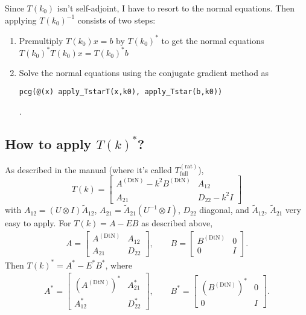 \documentclass[letterpaper,12pt]{article}
\newcommand{\dtnA}{A^{(\text{DtN})}}
\newcommand{\dtnB}{B^{(\text{DtN})}}
\begin{document}
Since $T(k_0)$ isn't self-adjoint, I have to resort to the normal equations.
Then applying $T(k_0)^{-1}$ consists of two steps:
\begin{enumerate}
 \item Premultiply $T(k_0)x = b$ by $T(k_0)^\ast$ to get the normal equations
       $T(k_0)^\ast T(k_0)x = T(k_0)^\ast b$
 \item Solve the normal equations using the conjugate gradient method as
       \begin{verbatim}pcg(@(x) apply_TstarT(x,k0), apply_Tstar(b,k0))
       \end{verbatim}.
\end{enumerate}

\subsection*{How to apply $T(k)^\ast$?}

As described in the manual (where it's called $T_{\text{full}}^{(\text{rat})}$),
\[
 T(k) = \begin{bmatrix}
         \dtnA - k^2 \dtnB & A_{12} \\ 
         A_{21}            & D_{22} - k^2 I
        \end{bmatrix}
\]
with $A_{12} = (U \otimes I)\tilde{A}_{12}$, 
$A_{21} = \tilde{A}_{21}(U^{-1} \otimes I)$, $D_{22}$ diagonal,
and $\tilde{A}_{12}$,
$\tilde{A}_{21}$ very easy to apply. For $T(k) = A - E B$ as described above,
\begin{align*}
 A = \begin{bmatrix} \dtnA & A_{12} \\ A_{21} & D_{22}\end{bmatrix}, \qquad
 B = \begin{bmatrix} \dtnB & 0 \\ 0 & I\end{bmatrix}.
\end{align*}
Then $T(k)^\ast = A^\ast - E^\ast B^\ast$, where
\begin{align*}
 A^\ast = \begin{bmatrix} \left(\dtnA\right)^\ast & A_{21}^\ast \\ 
                          A_{12}^\ast & D_{22}^\ast\end{bmatrix}, \qquad
 B^\ast = \begin{bmatrix} \left(\dtnB\right)^\ast & 0 \\ 0 & I\end{bmatrix}.
\end{align*}
\end{document}
